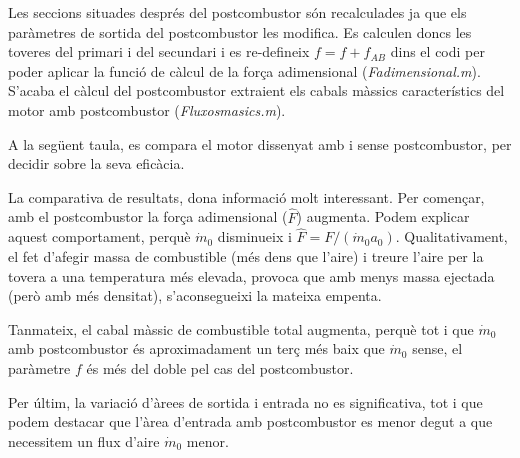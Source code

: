  
\noindent Les seccions situades després del postcombustor són recalculades ja que els paràmetres de sortida del postcombustor les modifica. Es calculen doncs les toveres del primari i del secundari i es re-defineix $f = f +f_{AB}$ dins el codi per poder aplicar la funció de càlcul de la força adimensional (\textit{Fadimensional.m}). S'acaba el càlcul del postcombustor extraient els cabals màssics característics del motor amb postcombustor (\textit{Fluxosmasics.m}).

\noindent A la següent taula, es compara el motor dissenyat amb i sense postcombustor, per decidir sobre la seva eficàcia.
\begin{table}[H]
	\centering
	\label{ABres}
	\caption{Resultats d'implementar el postcombustor.}
\end{table}


\noindent La comparativa de resultats, dona informació molt interessant. Per començar, amb el postcombustor la força adimensional ($\hat{F}$)  augmenta. Podem explicar aquest comportament, perquè $ \dot{m}_0$ disminueix i $\hat{F}=F/(\dot{m}_0a_0)$. Qualitativament, el fet d'afegir massa de combustible (més dens que l'aire) i treure l'aire per la tovera a una temperatura més elevada, provoca que amb menys massa ejectada (però amb més densitat), s'aconsegueixi la mateixa empenta.

\noindent Tanmateix, el cabal màssic de combustible total augmenta, perquè tot i que $ \dot{m}_0$ amb postcombustor és aproximadament un terç més baix  que $ \dot{m}_0$ sense, el paràmetre $ f$ és més del doble pel cas del postcombustor.

\noindent Per últim, la variació d'àrees de sortida i entrada no es significativa, tot i que podem destacar que l'àrea d'entrada amb postcombustor es menor degut a que necessitem un flux d'aire $ \dot{m}_0$ menor.

